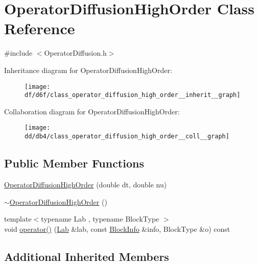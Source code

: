 \hypertarget{class_operator_diffusion_high_order}{}\section{Operator\+Diffusion\+High\+Order Class Reference}
\label{class_operator_diffusion_high_order}


{\ttfamily \#include $<$Operator\+Diffusion.\+h$>$}



Inheritance diagram for Operator\+Diffusion\+High\+Order\+:\nopagebreak
\begin{figure}[H]
\begin{center}
\leavevmode
\texttt{[image: df/d6f/class\_operator\_diffusion\_high\_order\_\_inherit\_\_graph]}
\end{center}
\end{figure}


Collaboration diagram for Operator\+Diffusion\+High\+Order\+:\nopagebreak
\begin{figure}[H]
\begin{center}
\leavevmode
\texttt{[image: dd/db4/class\_operator\_diffusion\_high\_order\_\_coll\_\_graph]}
\end{center}
\end{figure}
\subsection*{Public Member Functions}
\begin{DoxyCompactItemize}
\item 
\hyperlink{class_operator_diffusion_high_order_a086a3d39e9059f2b480b5919b0ed86dc}{Operator\+Diffusion\+High\+Order} (double dt, double nu)
\item 
\hyperlink{class_operator_diffusion_high_order_a33d1f96c66825ec4265e4eacd6759f06}{$\sim$\+Operator\+Diffusion\+High\+Order} ()
\item 
{\footnotesize template$<$typename Lab , typename Block\+Type $>$ }\\void \hyperlink{class_operator_diffusion_high_order_a27d274d97e6dffaf9babb2822f7eeb35}{operator()} (\hyperlink{_definitions_8h_ae720d9054713370bbf4c86860e4dde70}{Lab} \&lab, const \hyperlink{struct_block_info}{Block\+Info} \&info, Block\+Type \&o) const 
\end{DoxyCompactItemize}
\subsection*{Additional Inherited Members}


